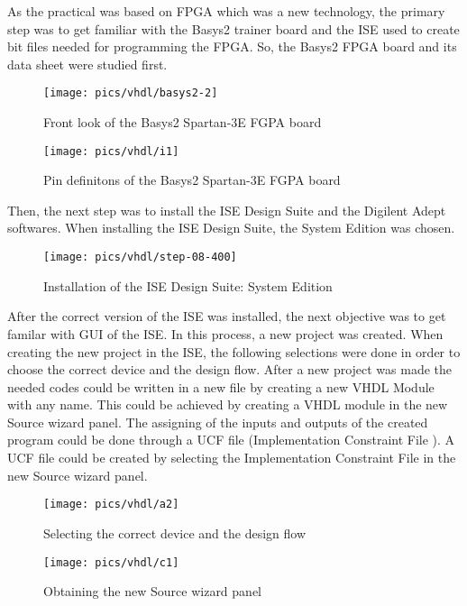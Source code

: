 \noindent
As the practical was based on FPGA which was a new technology, the primary step was to get familiar with the Basys2 trainer board and the ISE used to create bit files needed for programming the FPGA. So, the Basys2 FPGA board and its data sheet were studied first.

\begin{figure}[!h]
	\centering
	\texttt{[image: pics/vhdl/basys2-2]}
	\caption{Front look of the Basys2 Spartan-3E FGPA board }
	\label{fig:basys2-2}
\end{figure}

\begin{figure}[!h]
	\centering
	\texttt{[image: pics/vhdl/i1]}
	\caption{Pin definitons of the Basys2 Spartan-3E FGPA board}
	\label{fig:basys2pins}
\end{figure}

\noindent
Then, the next step was to install the ISE Design Suite and the Digilent Adept softwares. When installing the ISE Design Suite, the System Edition was chosen.


\begin{figure}[!h]
	\centering
	\texttt{[image: pics/vhdl/step-08-400]}
	\caption{Installation of the ISE Design Suite: System Edition}
	\label{fig:step-08-400}
\end{figure}

\noindent
After the correct version of the ISE was installed, the next objective was to get familar with GUI of the ISE. In this process, a new project was created. When creating the new project in the ISE, the following selections were done in order to choose the correct device and the design flow. After a new project was made the needed codes could be written in a new file  by creating a new VHDL Module with any name. This could be achieved by creating a VHDL module in the new Source wizard panel. The assigning of the inputs and outputs of the created program could be done through a UCF file (Implementation Constraint File ). A  UCF file could be created by selecting the Implementation Constraint File in the new Source wizard panel.

\begin{figure}[!h]
	\centering
	\texttt{[image: pics/vhdl/a2]}
	\caption{Selecting the correct device and the design flow}
	\label{fig:a2}
\end{figure}

\begin{figure}[!h]
	\centering
	\texttt{[image: pics/vhdl/c1]}
	\caption{Obtaining the new Source wizard panel}
	\label{fig:c1}
\end{figure}

